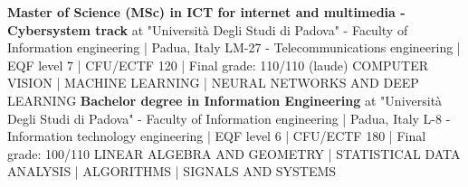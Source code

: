 %
%
%


\begin{scholarship}
					{\textbf{Master of Science (MSc) in ICT for internet and multimedia - Cybersystem track}}
	\scholarshipentry{}
	                {at "Università Degli Studi di Padova" - Faculty of Information engineering | Padua, Italy}
	\scholarshipentry{}
	                {LM-27 - Telecommunications engineering | EQF level 7 | CFU/ECTF 120 | Final grade: 110/110 (laude)}
	\scholarshipentry{}
					{COMPUTER VISION | MACHINE LEARNING | NEURAL NETWORKS AND DEEP LEARNING
	                }
					{\textbf{Bachelor degree in Information Engineering} }
	\scholarshipentry{}
	                {at "Università Degli Studi di Padova" - Faculty of Information engineering | Padua, Italy}
	\scholarshipentry{}
	                {L-8 - Information technology engineering | EQF level 6 | CFU/ECTF 180 | Final grade: 100/110}
	\scholarshipentry{}
					{LINEAR ALGEBRA AND GEOMETRY | STATISTICAL DATA ANALYSIS | ALGORITHMS | SIGNALS AND SYSTEMS
}
\end{scholarship}
